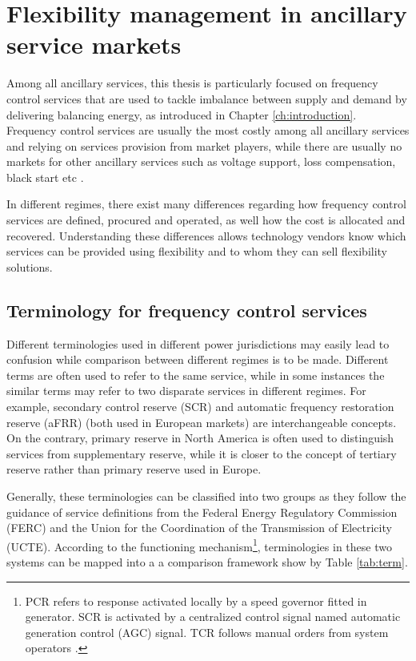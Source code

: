 \section{Flexibility management in ancillary service markets}
\label{sec:market-as}
Among all ancillary services, this thesis is particularly focused on frequency control services that are used to tackle imbalance between supply and demand by delivering balancing energy, as introduced in Chapter \ref{ch:introduction}. Frequency control services are usually the most costly among all ancillary services and relying on services provision from market players, while there are usually no markets for other ancillary services such as voltage support, loss compensation, black start etc \cite{Rebours2009,Cochran2013}. 

In different regimes, there exist many differences regarding how frequency control services are defined, procured and operated, as well how the cost is allocated and recovered. Understanding these differences allows technology vendors know which services can be provided using flexibility and to whom they can sell flexibility solutions.

\subsection{Terminology for frequency control services}
Different terminologies used in different power jurisdictions may easily lead to confusion while comparison between different regimes is to be made. Different terms are often used to refer to the same service, while in some instances the similar terms may refer to two disparate services in different regimes. For example, secondary control reserve (SCR) and automatic frequency restoration reserve (aFRR) (both used in European markets) are interchangeable concepts. On the contrary, primary reserve in North America is often used to distinguish services from supplementary reserve, while it is closer to the concept of tertiary reserve rather than primary reserve used in Europe.

Generally, these terminologies can be classified into two groups as they follow the guidance of service definitions from the Federal Energy Regulatory Commission (FERC) and the Union for the Coordination of the Transmission of Electricity (UCTE). According to the functioning mechanism\footnote{ PCR refers to response activated locally by a speed governor fitted in generator. SCR is activated by a centralized control signal named automatic generation control (AGC) signal. TCR follows manual orders from system operators \cite{EllisonJ.F.TesfatsionL.S.LooseV.W.Byrne2012}. }, terminologies in these two systems can be mapped into a a comparison framework show by Table \ref{tab:term}.

